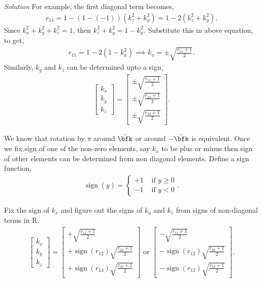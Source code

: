 \documentclass{article}
\DeclareMathOperator{\sign}{sign}
\numberwithin{prob}{section}
\newenvironment{solution}{\emph{Solution}}{}
\begin{document}
\begin{solution}
For example, the first diagonal term becomes,
\begin{align}
  r_{11} = 1 - (1-(-1))(k_z^2 + k_y^2) = 1-2(k_z^2 + k_y^2).
\end{align}
Since $k_x^2 + k_y^2 + k_z^2 = 1$, then $k_z^2 + k_y^2 =  1- k_x^2$. Substitute this in above equation, to get,
\begin{align}
  r_{11} =  1-2(1-k_x^2) \implies k_x = \pm \sqrt{\frac{r_{11}+1}{2}}.
\end{align}
Similarly, $k_y$ and $k_z$ can be determined upto a sign,
\begin{align}
  \begin{bmatrix}
    k_x \\ k_y \\ k_z
  \end{bmatrix} 
  = \begin{bmatrix}
\pm \sqrt{\frac{r_{11}+1}{2}}
\\
\pm \sqrt{\frac{r_{22}+1}{2}}
\\
\pm \sqrt{\frac{r_{33}+1}{2}}
  \end{bmatrix}.
\end{align}

We know that rotation by $\pi$ around $\hat{\bfk}$ or around $-\hat{\bfk}$ is equivalent. Once we fix sign of one of the non-zero elements, say $k_x$ to be plus or minus then sign of other elements can be determined from non diagonal elements. Define a sign function,
\begin{align}
  \sign(y) = \begin{cases}
    +1 & \text{ if } y \ge 0\\
    -1 & \text{ if } y < 0
  \end{cases}.
\end{align}

Fix the sign of $k_x$ and figure out the signs of $k_y$ and $k_z$ from signs of non-diagonal terms in R.
\begin{align}
  \begin{bmatrix}
    k_x \\ k_y \\ k_z
  \end{bmatrix} 
  = \begin{bmatrix}
+ \sqrt{\frac{r_{11}+1}{2}}
\\
+\sign(r_{12}) \sqrt{\frac{r_{22}+1}{2}}
\\
+\sign(r_{13}) \sqrt{\frac{r_{33}+1}{2}}
\end{bmatrix} \text{ or  }
\begin{bmatrix}
- \sqrt{\frac{r_{11}+1}{2}}
\\
-\sign(r_{12}) \sqrt{\frac{r_{22}+1}{2}}
\\
-\sign(r_{13}) \sqrt{\frac{r_{33}+1}{2}}
\end{bmatrix}.
\end{align}
\end{solution}
\end{document}
